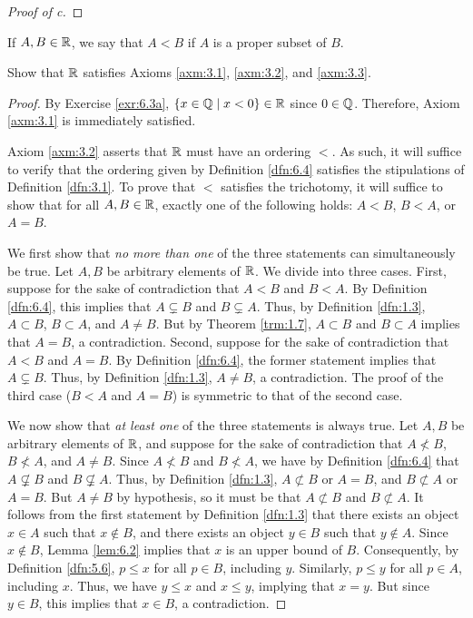 \documentclass[../main.tex]{subfiles}
\begin{document}
\begin{exercise}
\begin{proof}[Proof of c]
    \end{proof}
\end{exercise}

\begin{definition}\label{dfn:6.4}
    If $A,B\in\mathbb{R}$, we say that $A<B$ if $A$ is a proper subset of $B$.
\end{definition}

\begin{exercise}\label{exr:6.5}
    Show that $\mathbb{R}$ satisfies Axioms \ref{axm:3.1}, \ref{axm:3.2}, and \ref{axm:3.3}.
    \begin{proof}
        By Exercise \ref{exr:6.3a}, $\{x\in\mathbb{Q}\mid x<0\}\in\mathbb{R}$ since $0\in\mathbb{Q}$. Therefore, Axiom \ref{axm:3.1} is immediately satisfied.\par\medskip
        Axiom \ref{axm:3.2} asserts that $\mathbb{R}$ must have an ordering $<$. As such, it will suffice to verify that the ordering given by Definition \ref{dfn:6.4} satisfies the stipulations of Definition \ref{dfn:3.1}. To prove that $<$ satisfies the trichotomy, it will suffice to show that for all $A,B\in\mathbb{R}$, exactly one of the following holds: $A<B$, $B<A$, or $A=B$.\par
        We first show that \emph{no more than one} of the three statements can simultaneously be true. Let $A,B$ be arbitrary elements of $\mathbb{R}$. We divide into three cases. First, suppose for the sake of contradiction that $A<B$ and $B<A$. By Definition \ref{dfn:6.4}, this implies that $A\subsetneq B$ and $B\subsetneq A$. Thus, by Definition \ref{dfn:1.3}, $A\subset B$, $B\subset A$, and $A\neq B$. But by Theorem \ref{trm:1.7}, $A\subset B$ and $B\subset A$ implies that $A=B$, a contradiction. Second, suppose for the sake of contradiction that $A<B$ and $A=B$. By Definition \ref{dfn:6.4}, the former statement implies that $A\subsetneq B$. Thus, by Definition \ref{dfn:1.3}, $A\neq B$, a contradiction. The proof of the third case ($B<A$ and $A=B$) is symmetric to that of the second case.\par
        We now show that \emph{at least one} of the three statements is always true. Let $A,B$ be arbitrary elements of $\mathbb{R}$, and suppose for the sake of contradiction that $A\not<B$, $B\not<A$, and $A\neq B$. Since $A\not<B$ and $B\not<A$, we have by Definition \ref{dfn:6.4} that $A\not\subsetneq B$ and $B\not\subsetneq A$. Thus, by Definition \ref{dfn:1.3}, $A\not\subset B$ or $A=B$, and $B\not\subset A$ or $A=B$. But $A\neq B$ by hypothesis, so it must be that $A\not\subset B$ and $B\not\subset A$. It follows from the first statement by Definition \ref{dfn:1.3} that there exists an object $x\in A$ such that $x\notin B$, and there exists an object $y\in B$ such that $y\notin A$. Since $x\notin B$, Lemma \ref{lem:6.2} implies that $x$ is an upper bound of $B$. Consequently, by Definition \ref{dfn:5.6}, $p\leq x$ for all $p\in B$, including $y$. Similarly, $p\leq y$ for all $p\in A$, including $x$. Thus, we have $y\leq x$ and $x\leq y$, implying that $x=y$. But since $y\in B$, this implies that $x\in B$, a contradiction.\par\smallskip

\end{proof}
\end{exercise}
\end{document}
